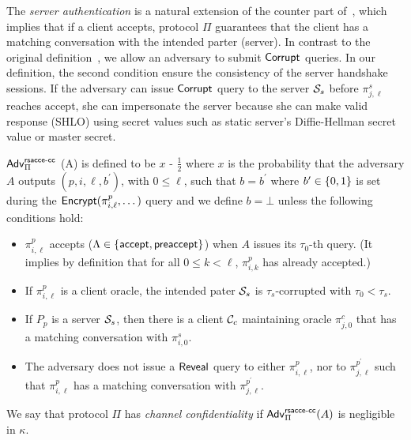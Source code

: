 \begin{remark}
 The \textit{server authentication} is a natural extension
 of the counter part of~\cite{KPW13:SACCE}, which implies
 that if a client accepts, protocol $\Pi$ guarantees that
 the client has a matching conversation with the intended
 parter (server). In contrast to the original
 definition~\cite{KPW13:SACCE}, we allow an adversary to
 submit $\mathsf{Corrupt}$ queries.
 In our definition, the second condition ensure the
 consistency of the server handshake sessions.
 If the adversary can issue $\mathsf{Corrupt}$ query to the server
 $\mathcal{S}_s$ before $\pi^s_{j, \ell}$ reaches accept, she can
 impersonate the server because she can make valid response
 (SHLO) using secret values such as static server's
 Diffie-Hellman secret value or master secret.
 \end{remark}

\begin{definition} \label{def:rsacce-cc}
 $\mathsf{Adv}^{\mathsf{rsacce\textsc{-} cc}}_{\Pi}$ (A) is defined to be
 $x$ - $\frac{1}{2}$ where $x$ is the probability that
 the adversary $A$ outputs $(p, i, \ell, b^{\prime})$,
 with $0\leq \ell$, such that $b = b^{\prime}$ where
 $b^{\prime} \in \{0,1\}$ is set during the
 $\mathsf{Encrypt}(\pi^p_{i,\ell},\dots)$ query and we define
 $b=\bot$ unless the following conditions hold:
 \begin{itemize}
  \item{$\pi^p_{i,\ell}$ accepts
  ($\Lambda \in \{\mathsf{accept}, \mathsf{preaccept}\}$) when $A$
  issues its $\tau_0$-th query. (It implies by
  definition that for all $0\leq k < \ell$,
  $\pi^p_{i,k}$ has already accepted.)}

  \item{If $\pi^p_{i,\ell}$ is a client oracle, the
  intended pater $\mathcal{S}_s$ is $\tau_s$-corrupted
  with $\tau_0 < \tau_s$. }

  \item{If $P_p$ is a server $\mathcal{S}_s$, then there
  is a client $\mathcal{C}_c$ maintaining oracle
  $\pi^c_{j,0}$ that has a matching conversation with
  $\pi^s_{i,0}$.}

  \item{The adversary does not issue a $\mathsf{Reveal}$ query
  to either $\pi^p_{i,\ell}$, nor to
  $\pi^{p^{\prime}}_{j,\ell}$ such that $\pi^p_{i,\ell}$
  has a matching conversation with
  $\pi^{p^{\prime}}_{j,\ell}$.}
 \end{itemize}
 We say that protocol $\Pi$ has
 \textit{channel confidentiality} if
 $\mathsf{Adv}^{\mathsf{rsacce\textsc{-} cc}}_{\Pi}(A)$ is negligible in $\kappa$.
\end{definition}

